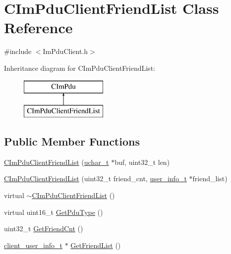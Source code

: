 \hypertarget{class_c_im_pdu_client_friend_list}{}\section{C\+Im\+Pdu\+Client\+Friend\+List Class Reference}
\label{class_c_im_pdu_client_friend_list}


{\ttfamily \#include $<$Im\+Pdu\+Client.\+h$>$}

Inheritance diagram for C\+Im\+Pdu\+Client\+Friend\+List\+:\begin{figure}[H]
\begin{center}
\leavevmode
\includegraphics[height=2.000000cm]{class_c_im_pdu_client_friend_list}
\end{center}
\end{figure}
\subsection*{Public Member Functions}
\begin{DoxyCompactItemize}
\item 
\hyperlink{class_c_im_pdu_client_friend_list_a68dc9e68c6e2ca8214d601d1731d562d}{C\+Im\+Pdu\+Client\+Friend\+List} (\hyperlink{base_2ostype_8h_a124ea0f8f4a23a0a286b5582137f0b8d}{uchar\+\_\+t} $\ast$buf, uint32\+\_\+t len)
\item 
\hyperlink{class_c_im_pdu_client_friend_list_a5e59b1e6c45a683374e6de3bbac10dca}{C\+Im\+Pdu\+Client\+Friend\+List} (uint32\+\_\+t friend\+\_\+cnt, \hyperlink{structuser__info__t}{user\+\_\+info\+\_\+t} $\ast$friend\+\_\+list)
\item 
virtual \hyperlink{class_c_im_pdu_client_friend_list_a08b84fa30413e0a7bc6d9dc8b1a8f020}{$\sim$\+C\+Im\+Pdu\+Client\+Friend\+List} ()
\item 
virtual uint16\+\_\+t \hyperlink{class_c_im_pdu_client_friend_list_a4524f18ab1d2f076b855feff14832443}{Get\+Pdu\+Type} ()
\item 
uint32\+\_\+t \hyperlink{class_c_im_pdu_client_friend_list_aaad5ac19435610621264b28be8206cb9}{Get\+Friend\+Cnt} ()
\item 
\hyperlink{structclient__user__info__t}{client\+\_\+user\+\_\+info\+\_\+t} $\ast$ \hyperlink{class_c_im_pdu_client_friend_list_ac3bda912c06edec96e72ddc2ab9ac781}{Get\+Friend\+List} ()
\end{DoxyCompactItemize}
